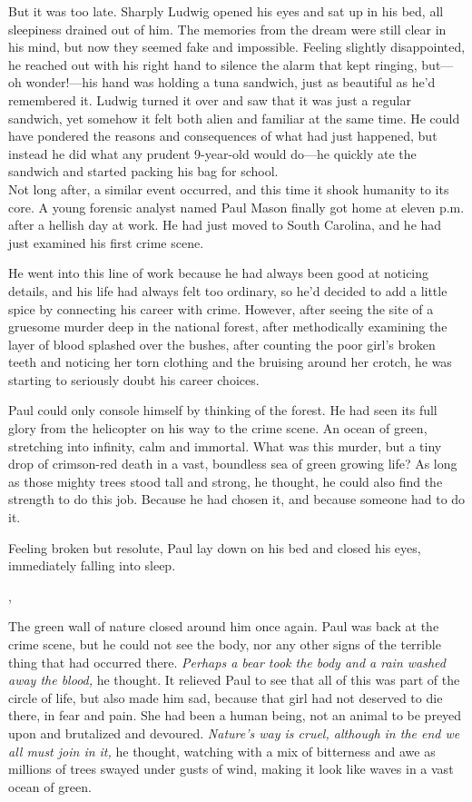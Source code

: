 \documentclass[openany, oneside]{book}
\begin{document}
But it was too late.
Sharply Ludwig opened his eyes and sat up in his bed, all sleepiness drained out of him.
The memories from the dream were still clear in his mind, but now they seemed fake and impossible.
Feeling slightly disappointed, he reached out with his right hand to silence the alarm that kept ringing, but---oh wonder!---his hand was holding a tuna sandwich, just as beautiful as he'd remembered it.
Ludwig turned it over and saw that it was just a regular sandwich, yet somehow it felt both alien and familiar at the same time.
He could have pondered the reasons and consequences of what had just happened, but instead he did what any prudent 9-year-old would do---he quickly ate the sandwich and started packing his bag for school.\\

Not long after, a similar event occurred, and this time it shook humanity to its core.
A young forensic analyst named Paul Mason finally got home at eleven p.m. after a hellish day at work.
He had just moved to South Carolina, and he had just examined his first crime scene.

He went into this line of work because he had always been good at noticing details, and his life had always felt too ordinary, so he'd decided to add a little spice by connecting his career with crime.
However, after seeing the site of a gruesome murder deep in the national forest, after methodically examining the layer of blood splashed over the bushes, after counting the poor girl's broken teeth and noticing her torn clothing and the bruising around her crotch, he was starting to seriously doubt his career choices.

Paul could only console himself by thinking of the forest.
He had seen its full glory from the helicopter on his way to the crime scene.
An ocean of green, stretching into infinity, calm and immortal.
What was this murder, but a tiny drop of crimson-red death in a vast, boundless sea of green growing life?
As long as those mighty trees stood tall and strong, he thought, he could also find the strength to do this job.
Because he had chosen it, and because someone had to do it.

Feeling broken but resolute, Paul lay down on his bed and closed his eyes, immediately falling into sleep.

\sep

The green wall of nature closed around him once again.
Paul was back at the crime scene, but he could not see the body, nor any other signs of the terrible thing that had occurred there.
\emph{Perhaps a bear took the body and a rain washed away the blood,} he thought.
It relieved Paul to see that all of this was part of the circle of life, but also made him sad, because that girl had not deserved to die there, in fear and pain.
She had been a human being, not an animal to be preyed upon and brutalized and devoured.
\emph{Nature's way is cruel, although in the end we all must join in it,} he thought, watching with a mix of bitterness and awe as millions of trees swayed under gusts of wind, making it look like waves in a vast ocean of green.
\end{document}
